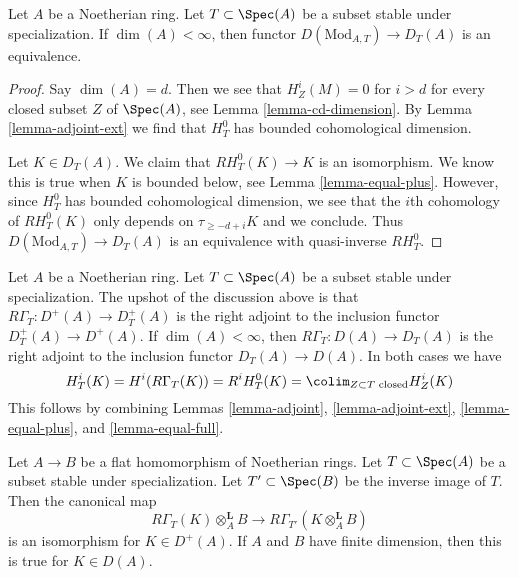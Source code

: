 \begin{lemma}
\label{lemma-equal-full}
Let $A$ be a Noetherian ring. Let $T \subset \Spec(A)$ be a subset stable
under specialization. If $\dim(A) < \infty$, then functor
$D(\text{Mod}_{A, T}) \to D_T(A)$ is an equivalence.
\end{lemma}

\begin{proof}
Say $\dim(A) = d$. Then we see that $H^i_Z(M) = 0$ for $i > d$
for every closed subset $Z$ of $\Spec(A)$, see
Lemma \ref{lemma-cd-dimension}.
By Lemma \ref{lemma-adjoint-ext} we find that $H^0_T$ has bounded
cohomological dimension.

\medskip\noindent
Let $K \in D_T(A)$. We claim that $RH^0_T(K) \to K$ is an
isomorphism. We know this is true when $K$ is bounded below, see
Lemma \ref{lemma-equal-plus}. However, since $H^0_T$ has bounded
cohomological dimension, we see that the $i$th cohomology of
$RH_T^0(K)$ only depends on $\tau_{\geq -d + i}K$ and we conclude.
Thus $D(\text{Mod}_{A, T}) \to D_T(A)$ is an equivalence with
quasi-inverse $RH^0_T$.
\end{proof}

\begin{remark}
\label{remark-upshot}
Let $A$ be a Noetherian ring. Let $T \subset \Spec(A)$ be a
subset stable under specialization.
The upshot of the discussion above is that
$R\Gamma_T : D^+(A) \to D_T^+(A)$ is the right adjoint
to the inclusion functor $D_T^+(A) \to D^+(A)$.
If $\dim(A) < \infty$, then
$R\Gamma_T : D(A) \to D_T(A)$ is the right adjoint
to the inclusion functor $D_T(A) \to D(A)$.
In both cases we have
$$
H^i_T(K) = H^i(R\Gamma_T(K)) = R^iH^0_T(K) =
\colim_{Z \subset T\text{ closed}} H^i_Z(K)
$$
This follows by combining
Lemmas \ref{lemma-adjoint}, \ref{lemma-adjoint-ext},
\ref{lemma-equal-plus}, and \ref{lemma-equal-full}.
\end{remark}

\begin{lemma}
\label{lemma-torsion-change-rings}
Let $A \to B$ be a flat homomorphism of Noetherian rings.
Let $T \subset \Spec(A)$ be a subset stable under specialization.
Let $T' \subset \Spec(B)$ be the inverse image of $T$.
Then the canonical map
$$
R\Gamma_T(K) \otimes_A^\mathbf{L} B
\longrightarrow
R\Gamma_{T'}(K \otimes_A^\mathbf{L} B)
$$
is an isomorphism for $K \in D^+(A)$. If $A$ and $B$ have finite
dimension, then this is true for $K \in D(A)$.
\end{lemma}

